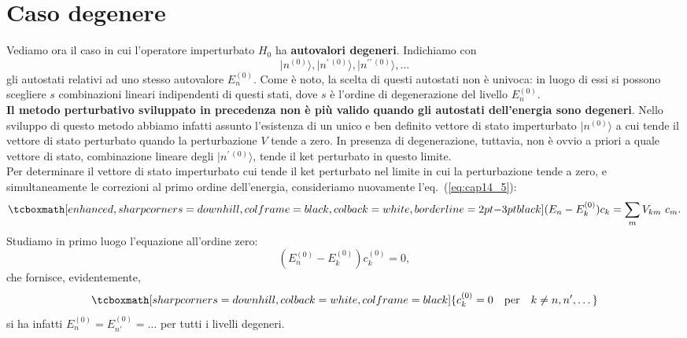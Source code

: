 \documentclass[a4paper,12pt,oneside]{book}
\begin{document}
\section{Caso degenere}
Vediamo ora il caso in cui l'operatore imperturbato $H_0$ ha \textbf{autovalori degeneri}. Indichiamo con
	\begin{equation}
		\vert n^{(0)} \rangle, \vert n^{\prime \,(0)} \rangle, \vert n^{\prime \prime \,(0)} \rangle, \dots
	\end{equation}
gli autostati relativi ad uno stesso autovalore $E_n ^{(0)}$. Come è noto, la scelta di questi autostati non è univoca: in luogo di essi si possono scegliere $s$ combinazioni lineari indipendenti di questi stati, dove $s$ è l'ordine di degenerazione del livello $E_n ^{(0)}$.\\

\textbf{Il metodo perturbativo sviluppato in precedenza non è più valido quando gli autostati dell'energia sono degeneri}. Nello sviluppo di questo metodo abbiamo infatti assunto l'esistenza di un unico e ben definito vettore di stato imperturbato $\vert n ^{(0)}\rangle$ a cui tende il vettore di stato perturbato quando la perturbazione $V$ tende a zero. In presenza di degenerazione, tuttavia, non è ovvio a priori a quale vettore di stato, combinazione lineare degli $\vert n^{\prime \,(0)}\rangle$, tende il ket perturbato in questo limite.\\

Per determinare il vettore di stato imperturbato cui tende il ket perturbato nel limite in cui la perturbazione tende a zero, e simultaneamente le correzioni al primo ordine dell'energia, consideriamo nuovamente l'eq.~(\ref{eq:cap14_5}):
	\begin{equation}
		\tcboxmath[enhanced, sharp corners=downhill, colframe=black, colback=white, borderline={2pt}{-3pt}{black}]{
			(E_n - E_k ^{(0)}) c_k = \sum _m V_{km}\ c_m.
			}
	\end{equation}
Studiamo in primo luogo l'equazione all'ordine zero:
	\begin{equation}
		\left( E_n ^{(0)} - E_k ^{(0)} \right) c_ k ^{(0)} =0,
	\end{equation}
che fornisce, evidentemente,
	\begin{equation}
		\tcboxmath[sharp corners=downhill, colback=white, colframe=black]{
			c_k ^{(0)} =0\quad \textrm{per} \quad k \neq n, n',\dots
			}
	\end{equation}
si ha infatti $E_n ^{(0)} = E_{n'} ^{(0)} = \dots $ per tutti i livelli degeneri.\\
\end{document}
